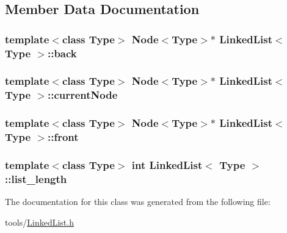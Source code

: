 \subsection{Member Data Documentation}
\hypertarget{classLinkedList_a5d5bdd036c6337dd7e40364b51868f72}{
\subsubsection[{back}]{\setlength{\rightskip}{0pt plus 5cm}template$<$class Type$>$ {\bf Node}$<$Type$>$$\ast$ {\bf Linked\-List}$<$ Type $>$\-::back\hspace{0.3cm}{\ttfamily [private]}}}\label{classLinkedList_a5d5bdd036c6337dd7e40364b51868f72}
\hypertarget{classLinkedList_a8a2c755c8107214e9edf7c9392259806}{
\subsubsection[{current\-Node}]{\setlength{\rightskip}{0pt plus 5cm}template$<$class Type$>$ {\bf Node}$<$Type$>$$\ast$ {\bf Linked\-List}$<$ Type $>$\-::current\-Node\hspace{0.3cm}{\ttfamily [private]}}}\label{classLinkedList_a8a2c755c8107214e9edf7c9392259806}
\hypertarget{classLinkedList_a08750bf69cde77f0f04ded5d0787a49b}{
\subsubsection[{front}]{\setlength{\rightskip}{0pt plus 5cm}template$<$class Type$>$ {\bf Node}$<$Type$>$$\ast$ {\bf Linked\-List}$<$ Type $>$\-::front\hspace{0.3cm}{\ttfamily [private]}}}\label{classLinkedList_a08750bf69cde77f0f04ded5d0787a49b}
\hypertarget{classLinkedList_a77c68b53ba781c46ca7de3fa80abc8cf}{
\subsubsection[{list\-\_\-length}]{\setlength{\rightskip}{0pt plus 5cm}template$<$class Type$>$ int {\bf Linked\-List}$<$ Type $>$\-::list\-\_\-length\hspace{0.3cm}{\ttfamily [private]}}}\label{classLinkedList_a77c68b53ba781c46ca7de3fa80abc8cf}


The documentation for this class was generated from the following file\-:\begin{DoxyCompactItemize}
\item 
tools/\hyperlink{LinkedList_8h}{Linked\-List.\-h}\end{DoxyCompactItemize}
